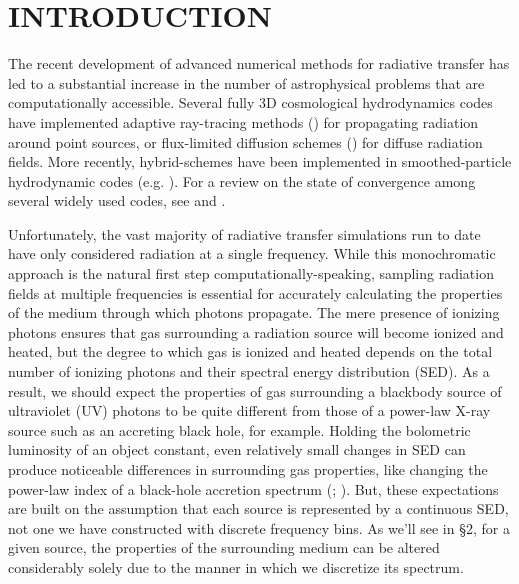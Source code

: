 \documentclass[preprint2]{aastex}              %
\begin{document}
\section{INTRODUCTION}
The recent development of advanced numerical methods for radiative transfer has led to a substantial increase in the number of astrophysical problems that are computationally accessible.   Several fully 3D cosmological hydrodynamics codes have implemented adaptive ray-tracing methods (\cite{Abel2002}) for propagating radiation around point sources,  or flux-limited diffusion schemes (\cite{Reynolds2009}) for diffuse radiation fields.  More recently, hybrid-schemes have been implemented in smoothed-particle hydrodynamic codes (e.g. \cite{Petkova2011}).  For a review on the state of convergence among several widely used codes, see \cite{Iliev2006} and \cite{Iliev2009}.

Unfortunately, the vast majority of radiative transfer simulations run to date have only considered radiation at a single frequency.  While this monochromatic approach is the natural first step computationally-speaking, sampling radiation fields at multiple frequencies is essential for accurately calculating the properties of the medium through which photons propagate.  The mere presence of ionizing photons ensures that gas surrounding a radiation source will become ionized and heated, but the degree to which gas is ionized and heated depends on the total number of ionizing photons and their spectral energy distribution (SED).  As a result, we should expect the properties of gas surrounding a blackbody source of ultraviolet (UV) photons to be quite different from those of a power-law X-ray source such as an accreting black hole, for example.  Holding the bolometric luminosity of an object constant, even relatively small changes in SED can produce noticeable differences in surrounding gas properties, like changing the power-law index of a black-hole accretion spectrum (\cite{Kuhlen2005}; \cite{Thomas2008}).  But, these expectations are built on the assumption that each source is represented by a continuous SED, not one we have constructed with \nnu discrete frequency bins.  As we'll see in \S2, for a given source, the properties of the surrounding medium can be altered considerably solely due to the manner in which we discretize its spectrum.
\end{document}
